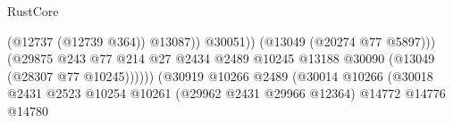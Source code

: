 \begin{lexlean}{RustCore}
\begin{coremodule}
                                                                                  (@12737
                                                                                    (@12739 @364))
                                                                                  @13087))
                                                                              @30051))
                                                                          (@13049
                                                                            (@20274 @77 @5897)))
                                                                        (@29875
                                                                          @243
                                                                          @77
                                                                          @214
                                                                          @27
                                                                          @2434
                                                                          @2489
                                                                          @10245
                                                                          @13188
                                                                          @30090
                                                                          (@13049
                                                                            (@28307 @77 @10245))))))
                                                                  (@30919
                                                                    @10266
                                                                    @2489
                                                                    (@30014
                                                                      @10266
                                                                      (@30018
                                                                        @2431
                                                                        @2523
                                                                        @10254
                                                                        @10261
                                                                        (@29962 @2431 @29966 @12364)
                                                                        @14772
                                                                        @14776
                                                                        @14780

\end{coremodule}
\end{lexlean}
